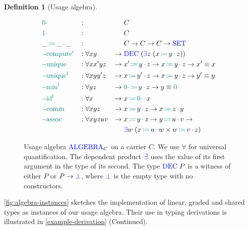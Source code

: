 \documentclass[sigplan,10pt,anonymous,review]{acmart}
\theoremstyle{definition}
\newtheorem{nidefinition}{Definition}
\newcommand{\type}[1]{\textcolor{blue}{\operatorname{#1}}}
\newcommand{\func}[1]{\textcolor{teal}{\operatorname{#1}}}
\newcommand{\op}[3]{#1 \, \func{\coloneqq} \, #2 \, \func{\cdot} \, #3}
\newcommand{\zero}{\func{0\cdot}}
\newcommand{\one}{\func{1\cdot}}
\newcommand{\Set}{\type{SET}}
\newcommand{\Algebra}{\type{ALGEBRA}}
\begin{document}
\begin{nidefinition}[Usage algebra]
  \begin{figure}[h]
  \begin{equation*}
  \begin{aligned}
    &\zero                   &:{} &                 &        & C \\
    &\one                    &:{} &                 &        & C \\
    &\op{\_}{\_}{\_}         &:{} &                 &        & C \to C \to C \to \Set \\
    &\func{\cdot-compute^r}  &:{} &\forall x y       & \to \; & \type{DEC} \; (\type{\exists} z  \; (\op{x}{y}{z})) \\
    &\func{\cdot-unique}     &:{} &\forall x x' y z  & \to \; & \op{x'}{y}{z} \to \op{x}{y}{z} \to x' \equiv x \\
    &\func{\cdot-unique^l}   &:{} &\forall x y y' z  & \to \; & \op{x}{y'}{z} \to \op{x}{y}{z} \to y' \equiv y \\
    &\func{\cdot-min^l}      &:{} &\forall y z        & \to \; & \op{\zero}{y}{z} \to y \equiv \zero \\
    &\func{\cdot-id^l}       &:{} &\forall x         & \to \; & \op{x}{\zero}{x} \\
    &\func{\cdot-comm}       &:{} &\forall x y z     & \to \; & \op{x}{y}{z} \to \op{x}{z}{y} \\
    &\func{\cdot-assoc}      &:{} &\forall x y z u v & \to \; & \op{x}{y}{z} \to \op{y}{u}{v} \to \\
    &                        &    &                  &        & \type{\exists} w  \; (\op{x}{u}{w} \times \op{w}{v}{z})
  \end{aligned}
  \end{equation*}
  \caption{
    Usage algebra $\Algebra_C$ on a carrier $C$.
    We use $\forall$ for universal quantification.
    The dependent product $\type{\exists}$ uses the value of its first argument in the type of its second.
    The type $\type{DEC} \; P$ is a witness of either $P$ or $P \to \type{\bot}$, where $\type{\bot}$ is the empty type with no constructors.
  }
  \label{fig:multiplicities}
  \end{figure}
\end{nidefinition}

\autoref{fig:algebra-instances} sketches the implementation of linear, graded and shared types as instances of our usage algebra.
Their use in typing derivations is illustrated in \autoref{example-derivation} (Continued).
\end{document}
